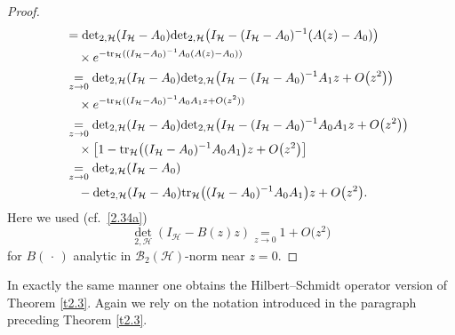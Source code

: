 \begin{proof}
\begin{align}
& \quad = {\det}_{2,{{\mathcal H}}}(I_{{\mathcal H}}-A_0)
{\det}_{2,{{\mathcal H}}}\big(I_{{\mathcal H}} - (I_{{\mathcal H}}-A_0)^{-1}(A(z)-A_0)\big) {\notag} \\
& \qquad \times e^{- {\text{\rm{tr}}}_{{\mathcal H}}((I_{{\mathcal H}}-A_0)^{-1} A_0(A(z)-A_0))} {\notag} \\
& \quad \underset{z\to 0}{=} {\det}_{2,{{\mathcal H}}}(I_{{\mathcal H}}-A_0)
{\det}_{2,{{\mathcal H}}}\big(I_{{\mathcal H}} - (I_{{\mathcal H}}-A_0)^{-1}A_1 z +
{O}\big(z^2\big)\big)  {\notag} \\
& \qquad \times e^{- {\text{\rm{tr}}}_{{\mathcal H}}((I_{{\mathcal H}}-A_0)^{-1} A_0A_1 z + {O}(z^2))} {\notag} \\
& \quad \underset{z\to 0}{=} {\det}_{2,{{\mathcal H}}}(I_{{\mathcal H}}-A_0)
{\det}_{2,{{\mathcal H}}}\big(I_{{\mathcal H}} - (I_{{\mathcal H}}-A_0)^{-1}A_0 A_1 z +
{O}\big(z^2\big)\big)  {\notag} \\
& \qquad \times \big[1 - {\text{\rm{tr}}}_{{\mathcal H}}\big((I_{{\mathcal H}}-A_0)^{-1}A_0 A_1\big)
z + {O}\big(z^2\big)\big]
{\notag} \\
& \quad \underset{z\to 0}{=} {\det}_{2,{{\mathcal H}}}(I_{{\mathcal H}}-A_0)  {\notag} \\
& \qquad - {\det}_{2,{{\mathcal H}}}(I_{{\mathcal H}}-A_0)
{\text{\rm{tr}}}_{{\mathcal H}}\big((I_{{\mathcal H}}-A_0)^{-1}A_0 A_1\big) z + {O}\big(z^2\big).
\end{align}
Here we used (cf.\ \eqref{2.34a})
\begin{equation}
{\det}_{2,{{\mathcal H}}}(I_{{\mathcal H}}-B(z) z) \underset{z\to 0}{=} 1 + {O}\big(z^2\big)
\end{equation}
for $B({\,\cdot\,})$ analytic in ${{\mathcal B}}_2({{\mathcal H}})$-norm near $z=0$.
\end{proof}

In exactly the same manner one obtains the Hilbert--Schmidt operator version of
Theorem \ref{t2.3}. Again we rely on the notation introduced in the
paragraph preceding Theorem \ref{t2.3}.

